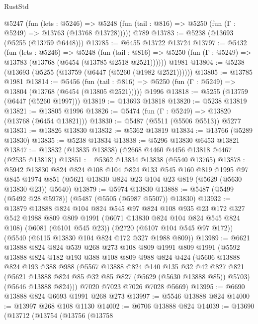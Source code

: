 \begin{lexlean}{RustStd}
\begin{coremodule}
    @5247
      (fun (lets : @5246) =>
      @5248 (fun (tail : @816) => @5250 (fun (Γ : @5249) => @13763 (@13768 @13728)))))
    @789
@13783 := @5238 (@13693 (@5255 (@13759 @6448)))
@13785 := @6455 @13722 @13724
@13797 := @5432
    (fun (lets : @5246) =>
    @5248
      (fun (tail : @816) =>
      @5250 (fun (Γ : @5249) => @13783 (@13768 (@6454 (@13785 @2518 @2521))))))
    @1981
@13804 := @5238 (@13693 (@5255 (@13759 (@6447 (@5260 (@1982 @2521))))))
@13805 := @13785 @1981
@13814 := @5456
    (fun (tail : @816) => @5250 (fun (Γ : @5249) => @13804 (@13768 (@6454 (@13805 @2521)))))
    @1996
@13818 := @5255 (@13759 (@6447 (@5260 @1997)))
@13819 := @13693 @13818
@13820 := @5238 @13819
@13821 := @13805 @1996
@13826 := @5474 (fun (Γ : @5249) => @13820 (@13768 (@6454 @13821)))
@13830 := @5487 (@5511 (@5506 @5513)) @5277
@13831 := @13826 @13830
@13832 := @5362 @13819
@13834 := @13766 (@5289 @13830)
@13835 := @5238 @13834
@13838 := @5296 @13830 @6453 @13821
@13847 := @13832 (@13835 @13838) (@2668 @4460 @4456 @13818 @4467 (@2535 @13818))
@13851 := @5362 @13834 @13838 (@5540 @13765)
@13878 := @5942
    @13830
    @824
    @824
    @108
    @104
    @824
    @133
    @545
    @160
    @819
    @1995
    @97
    @845
    @1974
    @851
    (@5621 @13830 @824 @23 @104 @23 @819 (@5629 (@5630 @13830 @23)) @5640)
@13879 := @5974 @13830
@13888 := @5487 (@5499 (@5492 @28 @5978)) (@5487 (@5505 (@5987 @5507)) @13830)
@13932 := @13879
    @13888
    @824
    @104
    @824
    @545
    @97
    @824
    @108
    @935
    @23
    @172
    @327
    @542
    @1988
    @809
    @809
    @1991
    (@6071 @13830 @824 @104 @824 @545 @824 @108)
    (@6081 (@6101 @545 @23))
    (@2720 (@6107 @104 @545 @97 @172))
    (@5540 (@6115 @13830 @104 @824 @172 @327 @1988 @809))
@13989 := @6621
    @13888
    @824
    @824
    @539
    @268
    @273
    @108
    @809
    @1991
    @809
    @1991
    (@5592
      @13888
      @824
      @182
      @193
      @388
      @108
      @809
      @988
      @824
      @424
      (@5606
        @13888
        @824
        @193
        @388
        @988
        (@5567
          @13888
          @824
          @140
          @135
          @32
          @42
          @827
          @821
          (@5621 @13888 @824 @85 @32 @85 @827 (@5629 (@5630 @13888 @85)) @5703)
          (@5646 @13888 @824)))
      @7020
      @7023
      @7026
      @7028
      @5669)
@13995 := @6690 @13888 @824 @6693 @1991 @268 @273
@13997 := @5546 @13888 @824
@14000 := @13997 @268 @108 @1130
@14002 := @6706 @13888 @824
@14039 := @13690
    (@13712
      (@13754
        (@13756
          (@13758

\end{coremodule}
\end{lexlean}
